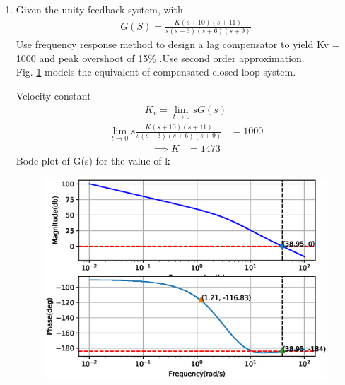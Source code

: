 
\begin{enumerate}[label=\thesubsection.\arabic*.,ref=\thesubsection.\theenumi]
\item Given the unity feedback system, with
\begin{align}
G(S) = \frac{K(s+10)(s+11)}{s(s+3)(s+6)(s+9)}
\end{align}
Use frequency response method to design a lag compensator to yield Kv = 1000 and peak overshoot of 15\% .Use second order approximation. \\
%
\solution Fig. \ref{fig:ee18btech11030_block} models the equivalent of compensated closed loop system. 
\begin{figure}[!ht]
\begin{center}
	\resizebox{\columnwidth}{!}{}
\end{center}
\caption{}
\label{fig:ee18btech11030_block}
\end{figure}

%

Velocity constant  
\begin{align}
K_{v} =  \lim_{t \to 0}sG(s)
\end{align}
\begin{align}
\lim_{t \to 0}s\frac{K(s+10)(s+11)}{s(s+3)(s+6)(s+9)} &= 1000
\end{align}
\begin{align}
\implies K &= 1473
\end{align}
Bode plot of G(s) for the value of k
%
\begin{figure}[!ht]
\centering
  \includegraphics[width=\columnwidth]{./figs/ee18btech11030/ee18btech11030_1.eps}
\caption{}
\label{fig:ee18btech11030_1}
\end{figure}


\end{enumerate}
